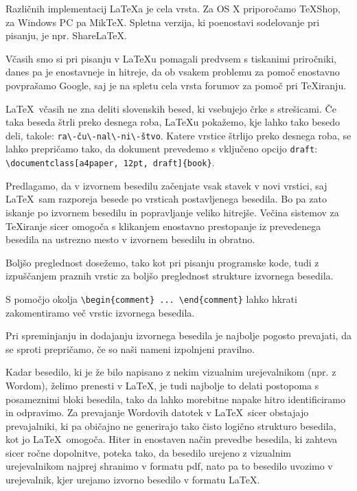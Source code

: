 \documentclass{feridiploma}
\begin{document}
	Različnih implementacij \LaTeX{}a je cela vrsta.
	Za OS X priporočamo TeXShop, za Windows PC pa MikTeX. Spletna verzija, ki poenostavi sodelovanje pri pisanju, je npr. ShareLaTeX.
	
	Včasih smo si pri pisanju v \LaTeX{}u  pomagali predvsem s tiskanimi pri\-ro\-čni\-ki, danes pa je enostavneje in hitreje, da ob vsakem problemu za pomoč enostavno povprašamo Google, 
	saj je na spletu cela vrsta forumov za pomoč pri \TeX{}iranju.
	
	\LaTeX\ včasih ne zna deliti slovenskih besed, ki vsebujejo črke s strešicami. 
	Če taka beseda štrli preko desnega roba,  \LaTeX{}u pokažemo, kje lahko tako besedo deli, takole: \verb=ra\-ču\-nal\-ni\-štvo=.
	Katere vrstice štrlijo preko desnega roba, se lahko prepričamo tako, da dokument prevedemo s vključeno opcijo \texttt{draft}: \verb=\documentclass[a4paper, 12pt, draft]{book}=.
	
	
	Predlagamo, da v izvornem besedilu začenjate vsak stavek v novi vrstici, saj \LaTeX\ sam razporeja besede po vrsticah postavljenega besedila. 
	Bo pa zato iskanje po izvornem besedilu in popravljanje veliko hitrejše. 
	Večina sistemov za \TeX{}iranje sicer omogoča s klikanjem enostavno prestopanje  iz prevedenega besedila na ustrezno mesto v izvornem besedilu in obratno.
	
	Boljšo preglednost dosežemo, tako kot pri pisanju programske kode, tudi z izpuščanjem praznih vrstic za boljšo preglednost strukture izvornega besedila.
	
	S pomočjo  okolja \verb=\begin{comment} ... \end{comment}= lahko  hkrati zakomentiramo več vrstic izvornega besedila.
	
	Pri spreminjanju in dodajanju izvornega besedila je najbolje pogosto prevajati, da se sproti prepričamo, če so naši nameni izpolnjeni pravilno.
	
	Kadar besedilo, ki je že bilo napisano z nekim vizualnim urejevalnikom (npr. z Wordom), želimo prenesti v \LaTeX, je tudi najbolje to delati postopoma s posameznimi bloki besedila, 
	tako da lahko morebitne napake hitro identificiramo in odpravimo.
	Za prevajanje Wordovih datotek v \LaTeX\ sicer obstajajo prevajalniki, ki pa običajno ne generirajo tako čisto logično strukturo besedila, kot jo  \LaTeX\ omogoča.
	Hiter in enostaven način prevedbe besedila, ki  zahteva sicer ročne dopolnitve, poteka tako, da besedilo urejeno z vizualnim urejevalnikom najprej shranimo v formatu pdf, 
	nato pa to besedilo uvozimo v urejevalnik, kjer urejamo izvorno besedilo v formatu \LaTeX.
	
\end{document}
